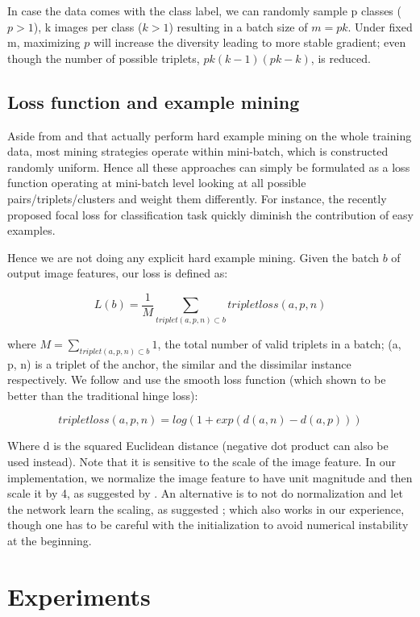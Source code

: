 \documentclass[10pt,twocolumn,letterpaper]{article}
\begin{document}
In case the data comes with the class label, we can randomly sample p classes ($p>1$), k images per class ($k>1$) resulting in a batch size of $m=pk$. Under fixed m, maximizing $p$ will increase the diversity leading to more stable gradient; even though the number of possible triplets, $pk(k-1)(pk-k)$, is reduced.

\subsection{Loss function and example mining}
Aside from \cite{radenovic2016cnn} and \cite{kumar2017smart} that actually perform hard example mining on the whole training data, most mining strategies operate within mini-batch, which is constructed randomly uniform. Hence all these approaches can simply be formulated as a loss function operating at mini-batch level looking at all possible pairs/triplets/clusters and weight them differently. For instance, the recently proposed focal loss for classification task \cite{lin2017focal} quickly diminish the contribution of easy examples.

Hence we are not doing any explicit hard example mining.
Given the batch $b$ of output image features, our loss is defined as:

$$L(b) = \frac{1}{M} \sum_{triplet (a,p,n) \subset b}^{} tripletloss(a, p, n)$$

where $M = \sum_{triplet (a,p,n) \subset b}^{} 1$, the total number of valid triplets in a batch; (a, p, n) is a triplet of the anchor, the similar and the dissimilar instance respectively. We follow \cite{vo2016localizing, sohn2016improved, hermans2017defense} and use the smooth loss function (which shown to be better than the traditional hinge loss):

$$tripletloss(a, p, n) = log(1 + exp(d(a,n) - d(a,p)))$$


Where d is the squared Euclidean distance (negative dot product can also be used instead). Note that it is sensitive to the scale of the image feature. In our implementation, we normalize the image feature to have unit magnitude and then scale it by 4, as suggested by \cite{vo2016localizing}. An alternative is to not do normalization and let the network learn the scaling, as suggested \cite{hermans2017defense}; which also works in our experience, though one has to be careful with the initialization to avoid numerical instability at the beginning.

\section{Experiments}
\end{document}
